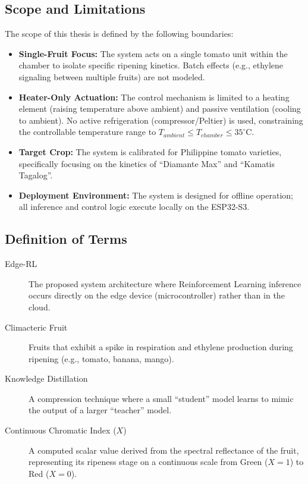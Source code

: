 \documentclass[conference]{IEEEtran}
\begin{document}
\subsection{Scope and Limitations}
The scope of this thesis is defined by the following boundaries:

\begin{itemize}
    \item \textbf{Single-Fruit Focus:} The system acts on a single tomato unit within the chamber to isolate specific ripening kinetics. Batch effects (e.g., ethylene signaling between multiple fruits) are not modeled.
    \item \textbf{Heater-Only Actuation:} The control mechanism is limited to a heating element (raising temperature above ambient) and passive ventilation (cooling to ambient). No active refrigeration (compressor/Peltier) is used, constraining the controllable temperature range to $T_{ambient} \le T_{chamber} \le 35^\circ$C.
    \item \textbf{Target Crop:} The system is calibrated for Philippine tomato varieties, specifically focusing on the kinetics of ``Diamante Max'' and ``Kamatis Tagalog''.
    \item \textbf{Deployment Environment:} The system is designed for offline operation; all inference and control logic execute locally on the ESP32-S3.
\end{itemize}

\subsection{Definition of Terms}
\begin{description}
    \item[Edge-RL] The proposed system architecture where Reinforcement Learning inference occurs directly on the edge device (microcontroller) rather than in the cloud.
    \item[Climacteric Fruit] Fruits that exhibit a spike in respiration and ethylene production during ripening (e.g., tomato, banana, mango).
    \item[Knowledge Distillation] A compression technique where a small ``student'' model learns to mimic the output of a larger ``teacher'' model.
    \item[Continuous Chromatic Index ($X$)] A computed scalar value derived from the spectral reflectance of the fruit, representing its ripeness stage on a continuous scale from Green ($X=1$) to Red ($X=0$).
\end{description}
\end{document}
